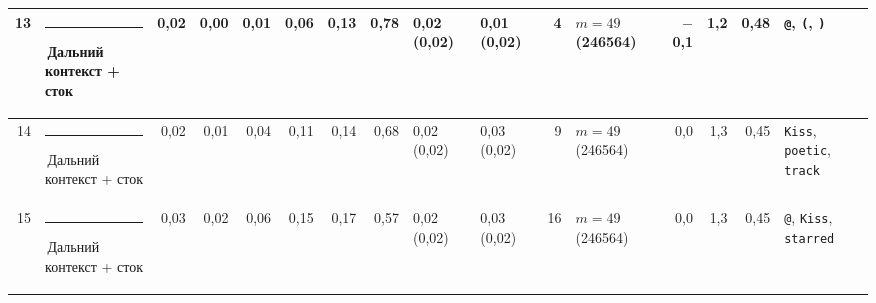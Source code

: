 \documentclass[10pt]{article}
\begin{document}
\begin{minipage}{\linewidth}
\begin{center}
{\begin{tabular}{|r|l|r|r|r|r|r|r|l|l|r|l|r|r|r|l|}
13 & \textcolor[HTML]{C3C2B7}{\rule{0.62em}{0.62em}}\,Дальний контекст + сток & 0,02 & 0,00 & 0,01 & 0,06 & 0,13 & 0,78 & 0,02 (0,02) & 0,01 (0,02) & 4 & $m{=}49$ (246564) & $-$0,1 & 1,2 & 0,48 & \texttt{\textvisiblespace{}@}, \texttt{\textvisiblespace{}(}, \texttt{\textvisiblespace{})} \\ \hline
14 & \textcolor[HTML]{C3C2B7}{\rule{0.62em}{0.62em}}\,Дальний контекст + сток & 0,02 & 0,01 & 0,04 & 0,11 & 0,14 & 0,68 & 0,02 (0,02) & 0,03 (0,02) & 9 & $m{=}49$ (246564) & 0,0 & 1,3 & 0,45 & \texttt{\textvisiblespace{}Kiss}, \texttt{\textvisiblespace{}poetic}, \texttt{\textvisiblespace{}track} \\ \hline
15 & \textcolor[HTML]{C3C2B7}{\rule{0.62em}{0.62em}}\,Дальний контекст + сток & 0,03 & 0,02 & 0,06 & 0,15 & 0,17 & 0,57 & 0,02 (0,02) & 0,03 (0,02) & 16 & $m{=}49$ (246564) & 0,0 & 1,3 & 0,45 & \texttt{\textvisiblespace{}@}, \texttt{\textvisiblespace{}Kiss}, \texttt{\textvisiblespace{}starred} \\ \hline
\hline\end{tabular}}\end{center}
\end{minipage}
\par\vspace{0.4em}
\end{document}
